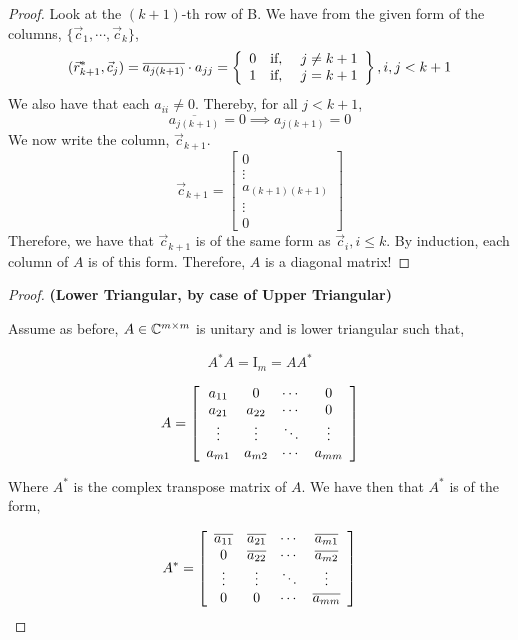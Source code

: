\documentclass{article}
\begin{document}
\begin{enumerate}
\begin{proof}
Look at the $(k+1)$-th row of B. We have from the given form of the columns, $\{\vec{c}_1, \cdots, \vec{c}_k\}$, 
\[
    (\vec{r}_{k+1}^*, \vec{c}_j) = \overline{a_{j(k+1)}}\cdot a_{jj} = \left\{\begin{array}{c c c}
                                                                0 & \text{if, } & j \neq k+1\\
                                                                1 & \text{if, } & j = k+1
                                                            \end{array}\right\}, i, j < k+1
\]
We also have that each $a_{ii} \neq 0$. Thereby, for all $j < k+1$, 
\[\overline{a_{j(k+1)}} = 0 \implies a_{j(k+1)} = 0\]We now write the column, $\vec{c}_{k+1}$. 
\[  
    \vec{c}_{k+1} = \left[\begin{array}{c}
                    0 \\
                    \vdots \\
                    a_{(k+1)(k+1)} \\
                    \vdots \\
                    0
                    \end{array}\right]
\]
Therefore, we have that $\vec{c}_{k+1}$ is of the same form as $\vec{c}_{i}, i \le k$. By induction, each column of $A$ is of this form. Therefore, $A$ is a diagonal matrix!


\end{proof}

\begin{proof}

\textbf{(Lower Triangular, by case of Upper Triangular)}

Assume as before,  $A \in \mathbb{C}^{m \times m}$ is unitary and is lower triangular such that,

\[ 
    A^*A = \mathrm{I}_m = AA^*
\]

\[
    A = \left[\begin{array}{c c c c}
        a_{11} & 0 & \cdots & 0 \\
        a_{21} & a_{22} & \cdots & 0 \\
        \vdots & \vdots & \ddots & \vdots \\
        a_{m1} & a_{m2} & \cdots  & a_{mm}
        \end{array}\right]
\] 

Where $A^*$ is the complex transpose matrix of $A$. We have then that $A^*$ is of the form, 

\[
    A^* = \left[\begin{array}{c c c c}
        \overline{a_{11}} & \overline{a_{21}} & \cdots & \overline{a_{m1}} \\
        0 & \overline{a_{22}} & \cdots & \overline{a_{m2}} \\
        \vdots & \vdots & \ddots & \vdots \\
        0 & 0 & \cdots  & \overline{a_{mm}}
        \end{array}\right]
\] 


\end{proof}
\end{enumerate}
\end{document}
